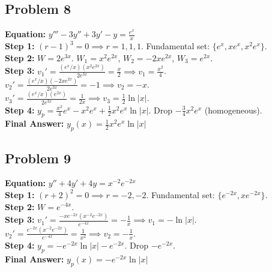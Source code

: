 \documentclass[11pt]{article}
\begin{document}
\subsection*{Problem 8}
\textbf{Equation:} $y''' - 3y'' + 3y' - y = \frac{e^x}{x}$ \\
\textbf{Step 1:} $(r-1)^3 = 0 \implies r = 1, 1, 1$. Fundamental set: $\{e^x, xe^x, x^2e^x\}$. \\
\textbf{Step 2:} $W = 2e^{3x}$. $W_1 = x^2e^{2x}$, $W_2 = -2xe^{2x}$, $W_3 = e^{2x}$. \\
\textbf{Step 3:} $v_1' = \frac{(e^x/x)(x^2e^{2x})}{2e^{3x}} = \frac{x}{2} \implies v_1 = \frac{x^2}{4}$. \\
$v_2' = \frac{(e^x/x)(-2xe^{2x})}{2e^{3x}} = -1 \implies v_2 = -x$. \\
$v_3' = \frac{(e^x/x)(e^{2x})}{2e^{3x}} = \frac{1}{2x} \implies v_3 = \frac{1}{2}\ln|x|$. \\
\textbf{Step 4:} $y_p = \frac{x^2}{4}e^x - x^2e^x + \frac{1}{2}x^2e^x\ln|x|$. Drop $-\frac{3}{4}x^2e^x$ (homogeneous). \\
\textbf{Final Answer:} $y_p(x) = \frac{1}{2}x^2e^x\ln|x|$

\subsection*{Problem 9}
\textbf{Equation:} $y'' + 4y' + 4y = x^{-2}e^{-2x}$ \\
\textbf{Step 1:} $(r+2)^2 = 0 \implies r = -2, -2$. Fundamental set: $\{e^{-2x}, xe^{-2x}\}$. \\
\textbf{Step 2:} $W = e^{-4x}$. \\
\textbf{Step 3:} $v_1' = \frac{-xe^{-2x}(x^{-2}e^{-2x})}{e^{-4x}} = -\frac{1}{x} \implies v_1 = -\ln|x|$. \\
$v_2' = \frac{e^{-2x}(x^{-2}e^{-2x})}{e^{-4x}} = \frac{1}{x^2} \implies v_2 = -\frac{1}{x}$. \\
\textbf{Step 4:} $y_p = -e^{-2x}\ln|x| - e^{-2x}$. Drop $-e^{-2x}$. \\
\textbf{Final Answer:} $y_p(x) = -e^{-2x}\ln|x|$
\end{document}
